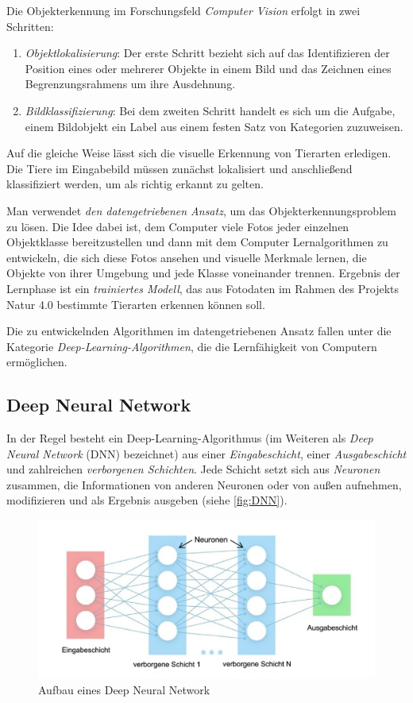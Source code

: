 Die Objekterkennung im Forschungsfeld \emph{Computer Vision} erfolgt in zwei Schritten:

\begin{enumerate}
	\item \emph{Objektlokalisierung}: Der erste Schritt bezieht sich auf das Identifizieren der Position eines oder mehrerer Objekte in einem Bild und das Zeichnen eines Begrenzungsrahmens um ihre Ausdehnung.
	
	\item \emph{Bildklassifizierung}: Bei dem zweiten Schritt handelt es sich um die Aufgabe, einem Bildobjekt ein Label aus einem festen Satz von Kategorien zuzuweisen.
\end{enumerate}

Auf die gleiche Weise lässt sich die visuelle Erkennung von Tierarten erledigen. Die Tiere im Eingabebild müssen zunächst lokalisiert und anschließend klassifiziert werden, um als richtig erkannt zu gelten.

Man verwendet \emph{den datengetriebenen Ansatz}, um das Objekterkennungsproblem zu lösen. Die Idee dabei ist, dem Computer viele Fotos jeder einzelnen Objektklasse bereitzustellen und dann mit dem Computer Lernalgorithmen zu entwickeln, die sich diese Fotos ansehen und visuelle Merkmale lernen, die Objekte von ihrer Umgebung und jede Klasse voneinander trennen. Ergebnis der Lernphase ist ein \emph{trainiertes Modell}, das aus Fotodaten im Rahmen des Projekts Natur 4.0 bestimmte Tierarten erkennen können soll.

Die zu entwickelnden Algorithmen im datengetriebenen Ansatz fallen unter die Kategorie \emph{Deep-Learning-Algorithmen}, die die Lernfähigkeit von Computern ermöglichen.

\subsection{Deep Neural Network}

In der Regel besteht ein Deep-Learning-Algorithmus (im Weiteren als \emph{Deep Neural Network} (DNN) bezeichnet) aus einer \emph{Eingabeschicht}, einer \emph{Ausgabeschicht} und zahlreichen \emph{verborgenen Schichten}. Jede Schicht setzt sich aus \emph{Neuronen} zusammen, die Informationen von anderen Neuronen oder von außen aufnehmen, modifizieren und als Ergebnis ausgeben (siehe \autoref{fig:DNN}).

\begin{figure}[!hb]
	\centering
	\includegraphics[width=\linewidth]{images/DNN}
	\caption{Aufbau eines Deep Neural Network}
	\label{fig:DNN}
\end{figure}

